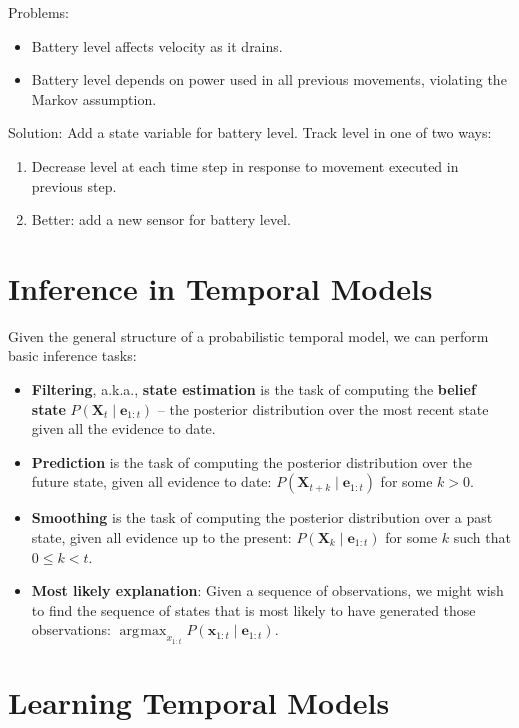 \documentclass[11pt]{article}
\DeclareMathOperator*{\argmax}{arg\!max}
\begin{document}
Problems:

\begin{itemize}
\item Battery level affects velocity as it drains.
\item Battery level depends on power used in all previous movements, violating the Markov assumption.
\end{itemize}

Solution: Add a state variable for battery level.  Track level in one of two ways:

\begin{enumerate}
\item Decrease level at each time step in response to movement executed in previous step.
\item Better: add a new sensor for battery level.
\end{enumerate}
\section{Inference in Temporal Models}
\label{sec:org50777b6}

Given the general structure of a probabilistic temporal model, we can perform basic inference tasks:

\begin{itemize}
\item \textbf{Filtering}, a.k.a., \textbf{state estimation} is the task of computing the \textbf{belief state} \(P(\bm{X}_t \mid \bm{e}_{1:t})\) -- the posterior distribution over the most recent state given all the evidence to date.

\item \textbf{Prediction} is the task of computing the posterior distribution over the future state, given all evidence to date: \(P(\bm{X}_{t+k} \mid \bm{e}_{1:t})\) for some \(k > 0\).

\item \textbf{Smoothing} is the task of computing the posterior distribution over a past state, given all evidence up to the present: \(P(\bm{X}_k \mid \bm{e}_{1:t})\) for some \(k\) such that \(0 \le k < t\).

\item \textbf{Most likely explanation}: Given a sequence of observations, we might wish to find the sequence of states that is most likely to have generated those observations: \(\argmax_{x_{1:t}} P(\bm{x}_{1:t} \mid \bm{e}_{1:t})\).
\end{itemize}
\section{Learning Temporal Models}
\label{sec:orgfcec186}
\end{document}
